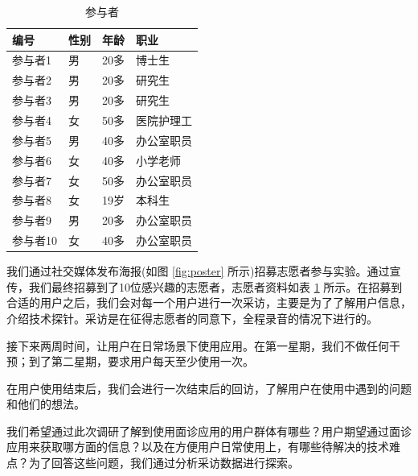 
\begin{table}
    \centering
    \begin{tabular}{llll}
          \toprule
          编号 &	性别 &	年龄 &	职业 \\
          \midrule
          参与者1 &	男 &	20多 &	博士生 \\
          参与者2 &	男 &	20多 &	研究生 \\
          参与者3 &	男 &	20多 &	研究生 \\
          参与者4 &	女 &	50多 &	医院护理工 \\
          参与者5 &	男 &	40多 &	办公室职员 \\
          参与者6 &	女 &	40多 &	小学老师 \\
          参与者7 &	女 &	50多 &	办公室职员 \\
          参与者8 &	女 &	19岁 &	本科生 \\
          参与者9 &	男 &	20多 &	办公室职员 \\
          参与者10 &	女 &	40多 &	办公室职员 \\
          \bottomrule
    \end{tabular}
    \caption{参与者}
    \label{tab:part}
  \end{table}
我们通过社交媒体发布海报(如图 \ref{fig:poster} 所示)招募志愿者参与实验。通过宣传，我们最终招募到了10位感兴趣的志愿者，志愿者资料如表 \ref{tab:part} 所示。在招募到合适的用户之后，我们会对每一个用户进行一次采访，主要是为了了解用户信息，介绍技术探针。采访是在征得志愿者的同意下，全程录音的情况下进行的。


接下来两周时间，让用户在日常场景下使用应用。在第一星期，我们不做任何干预；到了第二星期，要求用户每天至少使用一次。

在用户使用结束后，我们会进行一次结束后的回访，了解用户在使用中遇到的问题和他们的想法。

我们希望通过此次调研了解到使用面诊应用的用户群体有哪些？用户期望通过面诊应用来获取哪方面的信息？以及在方便用户日常使用上，有哪些待解决的技术难点？为了回答这些问题，我们通过分析采访数据进行探索。

